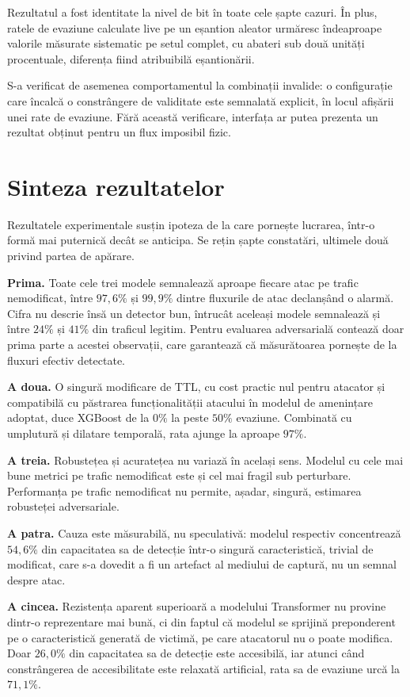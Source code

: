 Rezultatul a fost identitate la nivel de bit în toate cele șapte cazuri. În plus, ratele de evaziune calculate live pe un eșantion aleator urmăresc îndeaproape valorile măsurate sistematic pe setul complet, cu abateri sub două unități procentuale, diferența fiind atribuibilă eșantionării.

S-a verificat de asemenea comportamentul la combinații invalide: o configurație care încalcă o constrângere de validitate este semnalată explicit, în locul afișării unei rate de evaziune. Fără această verificare, interfața ar putea prezenta un rezultat obținut pentru un flux imposibil fizic.

\section{Sinteza rezultatelor}\label{sec:sinteza}

Rezultatele experimentale susțin ipoteza de la care pornește lucrarea, într-o formă mai puternică decât se anticipa. Se rețin șapte constatări, ultimele două privind partea de apărare.

\textbf{Prima.} Toate cele trei modele semnalează aproape fiecare atac pe trafic nemodificat, între $97{,}6\%$ și $99{,}9\%$ dintre fluxurile de atac declanșând o alarmă. Cifra nu descrie însă un detector bun, întrucât aceleași modele semnalează și între $24\%$ și $41\%$ din traficul legitim. Pentru evaluarea adversarială contează doar prima parte a acestei observații, care garantează că măsurătoarea pornește de la fluxuri efectiv detectate.

\textbf{A doua.} O singură modificare de TTL, cu cost practic nul pentru atacator și compatibilă cu păstrarea funcționalității atacului în modelul de amenințare adoptat, duce XGBoost de la $0\%$ la peste $50\%$ evaziune. Combinată cu umplutură și dilatare temporală, rata ajunge la aproape $97\%$.

\textbf{A treia.} Robustețea și acuratețea nu variază în același sens. Modelul cu cele mai bune metrici pe trafic nemodificat este și cel mai fragil sub perturbare. Performanța pe trafic nemodificat nu permite, așadar, singură, estimarea robusteței adversariale.

\textbf{A patra.} Cauza este măsurabilă, nu speculativă: modelul respectiv concentrează $54{,}6\%$ din capacitatea sa de detecție într-o singură caracteristică, trivial de modificat, care s-a dovedit a fi un artefact al mediului de captură, nu un semnal despre atac.

\textbf{A cincea.} Rezistența aparent superioară a modelului Transformer nu provine dintr-o reprezentare mai bună, ci din faptul că modelul se sprijină preponderent pe o caracteristică generată de victimă, pe care atacatorul nu o poate modifica. Doar $26{,}0\%$ din capacitatea sa de detecție este accesibilă, iar atunci când constrângerea de accesibilitate este relaxată artificial, rata sa de evaziune urcă la $71{,}1\%$.


